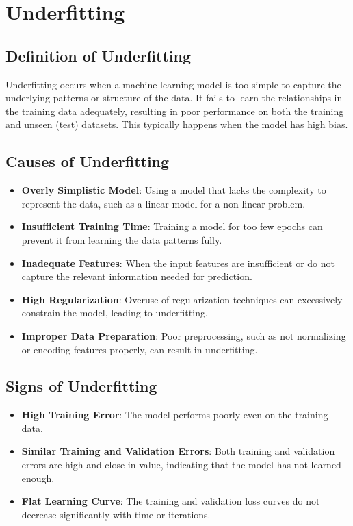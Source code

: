 \section{Underfitting}

\subsection*{Definition of Underfitting}
Underfitting occurs when a machine learning model is too simple to capture the underlying patterns or structure of the data. It fails to learn the relationships in the training data adequately, resulting in poor performance on both the training and unseen (test) datasets. This typically happens when the model has high bias.

\subsection*{Causes of Underfitting}
\begin{itemize}
    \item \textbf{Overly Simplistic Model}: Using a model that lacks the complexity to represent the data, such as a linear model for a non-linear problem.
    \item \textbf{Insufficient Training Time}: Training a model for too few epochs can prevent it from learning the data patterns fully.
    \item \textbf{Inadequate Features}: When the input features are insufficient or do not capture the relevant information needed for prediction.
    \item \textbf{High Regularization}: Overuse of regularization techniques can excessively constrain the model, leading to underfitting.
    \item \textbf{Improper Data Preparation}: Poor preprocessing, such as not normalizing or encoding features properly, can result in underfitting.
\end{itemize}

\subsection*{Signs of Underfitting}
\begin{itemize}
    \item \textbf{High Training Error}: The model performs poorly even on the training data.
    \item \textbf{Similar Training and Validation Errors}: Both training and validation errors are high and close in value, indicating that the model has not learned enough.
    \item \textbf{Flat Learning Curve}: The training and validation loss curves do not decrease significantly with time or iterations.
\end{itemize}

